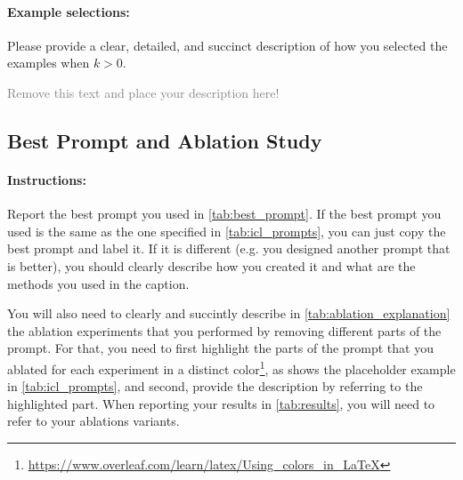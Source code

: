 \documentclass{article}
\begin{document}
\paragraph{Example selections:} Please provide a clear, detailed, and succinct description of how you selected the examples when $k > 0$.

\textcolor{gray}{Remove this text and place your description here!}



\newpage



\subsection{Best Prompt and Ablation Study}



\paragraph{Instructions:} Report the best prompt you used in \autoref{tab:best_prompt}.
If the best prompt you used is the same as the one specified in \autoref{tab:icl_prompts}, you can just copy the best prompt and label it.
If it is different (e.g. you designed another prompt that is better), you should clearly describe how you created it and what are the methods you used in the caption.

You will also need to clearly and succintly describe in \autoref{tab:ablation_explanation} the ablation experiments that you performed by removing different parts of the prompt.
For that, you need to first highlight the parts of the prompt that you ablated for each experiment in a distinct color\footnote{\url{https://www.overleaf.com/learn/latex/Using_colors_in_LaTeX}}, as shows the placeholder example in \autoref{tab:icl_prompts}, and second, provide the description by referring to the highlighted part.
When reporting your results in \autoref{tab:results}, you will need to refer to your ablations variants.
\end{document}
